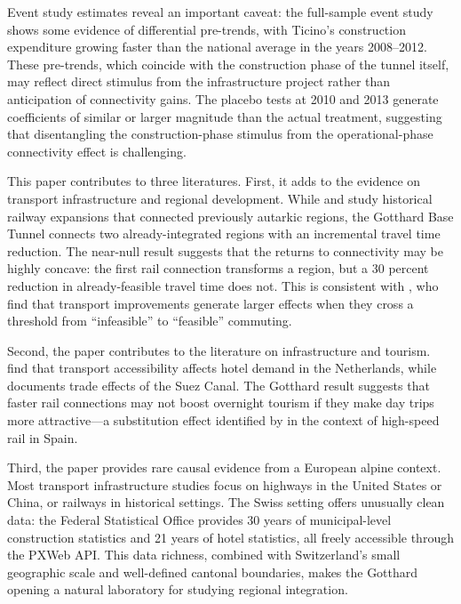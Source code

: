 \documentclass[12pt]{article}
\begin{document}
Event study estimates reveal an important caveat: the full-sample event study shows some evidence of differential pre-trends, with Ticino's construction expenditure growing faster than the national average in the years 2008--2012. These pre-trends, which coincide with the construction phase of the tunnel itself, may reflect direct stimulus from the infrastructure project rather than anticipation of connectivity gains. The placebo tests at 2010 and 2013 generate coefficients of similar or larger magnitude than the actual treatment, suggesting that disentangling the construction-phase stimulus from the operational-phase connectivity effect is challenging.

This paper contributes to three literatures. First, it adds to the evidence on transport infrastructure and regional development. While \citet{donaldson2018} and \citet{hornbeck2016} study historical railway expansions that connected previously autarkic regions, the Gotthard Base Tunnel connects two already-integrated regions with an incremental travel time reduction. The near-null result suggests that the returns to connectivity may be highly concave: the first rail connection transforms a region, but a 30 percent reduction in already-feasible travel time does not. This is consistent with \citet{ahlfeldt2015}, who find that transport improvements generate larger effects when they cross a threshold from ``infeasible'' to ``feasible'' commuting.

Second, the paper contributes to the literature on infrastructure and tourism. \citet{koster2019} find that transport accessibility affects hotel demand in the Netherlands, while \citet{donaldson2016} documents trade effects of the Suez Canal. The Gotthard result suggests that faster rail connections may not boost overnight tourism if they make day trips more attractive---a substitution effect identified by \citet{gutiérrez2020} in the context of high-speed rail in Spain.

Third, the paper provides rare causal evidence from a European alpine context. Most transport infrastructure studies focus on highways in the United States or China, or railways in historical settings. The Swiss setting offers unusually clean data: the Federal Statistical Office provides 30 years of municipal-level construction statistics and 21 years of hotel statistics, all freely accessible through the PXWeb API. This data richness, combined with Switzerland's small geographic scale and well-defined cantonal boundaries, makes the Gotthard opening a natural laboratory for studying regional integration.
\end{document}
